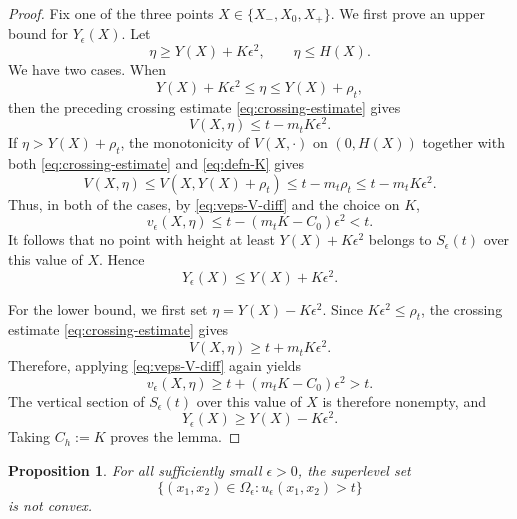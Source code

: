 \documentclass[reqno,12pt]{amsart}
\numberwithin{equation}{section}
\newtheorem{proposition}[theorem]{Proposition}
\theoremstyle{remark}
\begin{document}
\begin{proof}
Fix one of the three points $X\in\{X_-,X_0,X_+\}$.  We first prove an upper
bound for $Y_\epsilon(X)$. Let
$$
\eta\ge Y(X)+K\epsilon^2, \qquad \eta\le H(X).
$$
We have two cases. When
$$Y(X)+K\epsilon^2\le \eta\le Y(X)+\rho_t,$$ then the preceding crossing estimate \eqref{eq:crossing-estimate} gives
$$
V(X,\eta)\le t-m_tK\epsilon^2.
$$
If $\eta>Y(X)+\rho_t$, the monotonicity of $V(X,\cdot)$ on $(0,H(X))$ together with both \eqref{eq:crossing-estimate} and \eqref{eq:defn-K}  gives
$$
V(X,\eta) \le V(X,Y(X)+\rho_t)
\le t-m_t\rho_t \le t-m_tK\epsilon^2.
$$
Thus, in both of the cases, by \eqref{eq:veps-V-diff} and the choice on $K$,
$$
v_\epsilon(X,\eta)
\le t-(m_tK-C_0)\epsilon^2<t.
$$
It follows that no point with height at least $Y(X)+K\epsilon^2$ belongs to
$S_\epsilon(t)$ over this value of $X$.  Hence
$$
Y_\epsilon(X)
\le Y(X)+K\epsilon^2.
$$

For the lower bound, we first set $\eta=Y(X)-K\epsilon^2.$
Since $K\epsilon^2\le\rho_t$, the crossing estimate  \eqref{eq:crossing-estimate} gives
$$
V(X,\eta)
\ge t+m_tK\epsilon^2.
$$
Therefore, applying \eqref{eq:veps-V-diff} again yields
$$
v_\epsilon(X,\eta)
\ge t+(m_tK-C_0)\epsilon^2>t.
$$
The vertical section of $S_\epsilon(t)$ over this value of $X$ is therefore
nonempty, and
\begin{equation}\label{eq:height-lower-bound}
    Y_\epsilon(X)\ge Y(X)-K\epsilon^2.
\end{equation}
Taking $C_h:=K$ proves the lemma.
\end{proof}

\begin{proposition} \label{prop:actual-midpoint}
For all sufficiently small $\epsilon>0$, the superlevel set
$$
\{(x_1,x_2)\in\Omega_\epsilon:u_\epsilon(x_1,x_2)>t\}
$$
is not convex.
\end{proposition}
\end{document}
